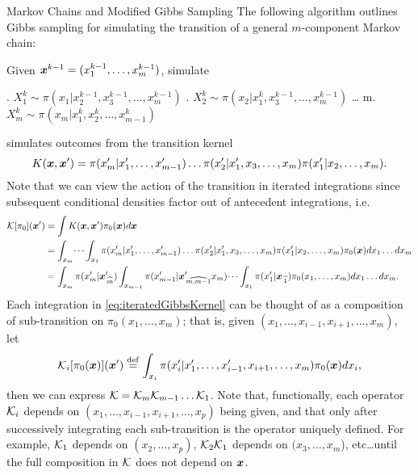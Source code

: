 \begin{chapter}{Markov Chains and Modified Gibbs Sampling}
The following algorithm outlines Gibbs sampling for simulating the transition of a general $m$-component Markov chain:
\begin{algorithm}
\caption{Gibbs sampler} \label{alg:gibbs}
  Given $\mbox{\boldmath$x$}^{k-1} = (x_1^{k-1},\dots,x_m^{k-1})$, simulate
\begin{algorithmic}[0]
  . $X_1^{k} \sim \pi(x_1|x_2^{k-1},x_3^{k-1},\dots,x_m^{k-1})$
  . $X_2^{k} \sim \pi(x_2|x_1^k,x_3^{k-1},\dots,x_m^{k-1})$ 
  \STATE \dots
  \STATE m. $X_m^{k} \sim \pi(x_m|x_1^k,x_2^{k},\dots,x_{m-1}^{k})$
\end{algorithmic}
\end{algorithm}

 simulates outcomes from the transition kernel 
\begin{equation}
  K(\mbox{\boldmath$x$},\mbox{\boldmath$x$}') = \pi(x_m'|x_1',\dots,x_{m-1}')\dots\pi(x_2'|x_1',x_3,\dots,x_m)\pi(x_1'|x_2,\dots,x_m).
\end{equation}
Note that we can view the action of the transition in iterated integrations since subsequent conditional densities factor out of antecedent integrations, i.e.
\begin{align}
  \mathcal K [\pi_0](\mbox{\boldmath$x$}') 
    &= \int K(\mbox{\boldmath$x$},\mbox{\boldmath$x$}') \pi_0(\mbox{\boldmath$x$}) d\mbox{\boldmath$x$} \nonumber \\
    &= \int_{x_m}\dots\int_{x_1}\pi(x_m'|x_1',\dots,x_{m-1}')\dots\pi(x_2'|x_1',x_3,\dots,x_m)\pi(x_1'|x_2,\dots,x_m) \pi_0(\mbox{\boldmath$x$})dx_1\dots dx_m \nonumber\\ 
    &= \int_{x_m}\pi(x_m'|\mbox{\boldmath$x$}_{\,\widehat{m}}')\int_{x_{m-1}} \pi(x_{m-1}'|\mbox{\boldmath$x$}_{\,\widehat{m,m-1}}'x_m)\dots\int_{x_1} \pi(x_1'|\mbox{\boldmath$x$}_{\,\widehat{1}}) \pi_0(x_1,\dots,x_m)dx_1\dots dx_m. \label{eq:iteratedGibbsKernel}
\end{align}
Each integration in \eqref{eq:iteratedGibbsKernel} can be thought of as a composition of sub-transition on $\pi_0(x_1,\dots,x_m)$; that is, given $(x_1,\dots,x_{i-1},x_{i+1},\dots,x_m)$, let
\begin{equation}
  \mathcal K_i[\pi_0(\mbox{\boldmath$x$})](\mbox{\boldmath$x$}') \stackrel{\rm def}{=} \int_{x_i} \pi(x_i'|x_1',\dots,x_{i-1}',x_{i+1},\dots,x_m) \pi_0(\mbox{\boldmath$x$})dx_i,
\end{equation}
then we can express $\mathcal K = \mathcal K_m\mathcal K_{m-1} \dots \mathcal K_1$.
Note that, functionally, each operator $\mathcal K_i$ depends on $(x_1,\dots,x_{i-1},x_{i+1},\dots,x_p)$ being given, and that only after successively integrating each sub-transition is the operator uniquely defined.
For example, $\mathcal K_1$ depends on $(x_2,\dots,x_p)$, $\mathcal K_2 \mathcal K_1$ depends on $(x_3,\dots,x_m$), etc\dots until the full composition in $\mathcal K$ does not depend on $\mbox{\boldmath$x$}$.


\end{chapter}
